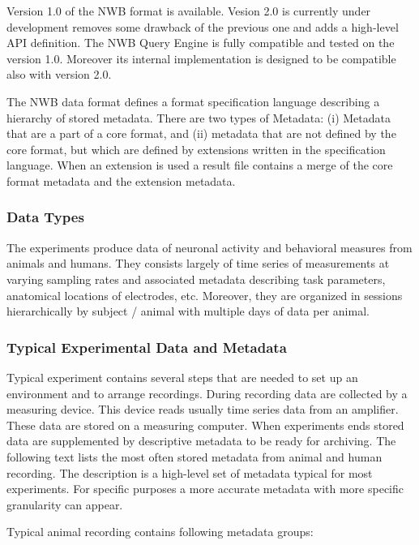\documentclass[utf8]{frontiersSCNS} %
\begin{document}
Version 1.0 of the NWB format is available. Vesion 2.0 is currently under development removes some drawback of the previous one and adds a high-level API definition. The NWB Query Engine is fully compatible and tested on the version 1.0. Moreover its internal implementation is designed to be compatible also with version 2.0. 

The NWB data format defines a format specification language describing a hierarchy of stored metadata. There are two types of Metadata: (i) Metadata that are a part of a core format, and (ii) metadata that are not defined by the core format, but which are defined by extensions written in the specification language. When an extension is used a result file contains a merge of the core format metadata and the extension metadata.


\subsubsection{Data Types}
\label{data-types}

The experiments produce data of neuronal activity and behavioral measures from animals and humans. They consists largely of time series of measurements at varying sampling rates and associated metadata describing task parameters, anatomical locations of electrodes, etc. Moreover, they are organized in sessions hierarchically by subject / animal with multiple days of data per animal.

\subsubsection{Typical Experimental Data and Metadata}
\label{typical-data-analysis-steps}

Typical experiment contains several steps that are needed to set up an environment and to arrange recordings. During recording data are collected by a measuring device. This device reads usually time series data from an amplifier. These data are stored on a measuring computer. When experiments ends stored data are supplemented by descriptive metadata to be ready for archiving. The following text lists the most often stored metadata from animal and human recording. The description is a high-level set of metadata typical for most experiments. For specific purposes a more accurate metadata with more specific granularity can appear.

Typical animal recording contains following metadata groups:
\end{document}
